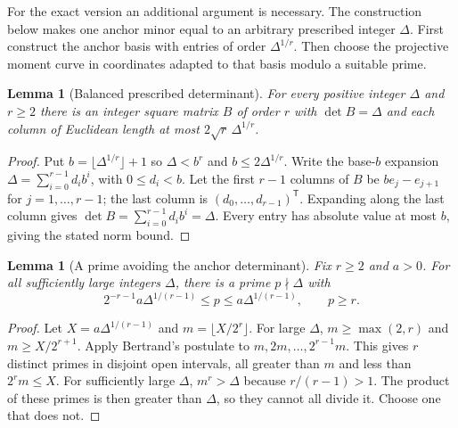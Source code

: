 \documentclass[11pt]{article}
\newtheorem{lemma}[theorem]{Lemma}
\theoremstyle{remark}\newtheorem{remark}[theorem]{Remark}
\begin{document}
For the exact version an additional argument is necessary. The construction below makes one anchor minor equal to an arbitrary prescribed integer $\Delta$. First construct the anchor basis with entries of order $\Delta^{1/r}$. Then choose the projective moment curve in coordinates adapted to that basis modulo a suitable prime.

\begin{lemma}[Balanced prescribed determinant]\label{lem:anchor}
For every positive integer $\Delta$ and $r\ge2$ there is an integer square matrix $B$ of order $r$ with $\det B=\Delta$ and each column of Euclidean length at most $2\sqrt r\,\Delta^{1/r}$.
\end{lemma}
\begin{proof}
Put $b=\lfloor\Delta^{1/r}\rfloor+1$ so $\Delta<b^r$ and $b\le 2\Delta^{1/r}$. Write the base-$b$ expansion $\Delta=\sum_{i=0}^{r-1}d_i b^i$, with $0\le d_i<b$. Let the first $r-1$ columns of $B$ be $b e_j-e_{j+1}$ for $j=1,\ldots,r-1$; the last column is $(d_0,\ldots,d_{r-1})^{\mathsf T}$. Expanding along the last column gives $\det B=\sum_{i=0}^{r-1}d_i b^i=\Delta$. Every entry has absolute value at most $b$, giving the stated norm bound.
\end{proof}

\begin{lemma}[A prime avoiding the anchor determinant]\label{lem:prime}
Fix $r\ge2$ and $a>0$. For all sufficiently large integers $\Delta$, there is a prime $p\nmid\Delta$ with
\begin{equation}\label{eq:prime}
 2^{-r-1}a\Delta^{1/(r-1)}\le p\le a\Delta^{1/(r-1)},\qquad p\ge r.
\end{equation}
\end{lemma}
\begin{proof}
Let $X=a\Delta^{1/(r-1)}$ and $m=\lfloor X/2^r\rfloor$. For large $\Delta$, $m\ge\max(2,r)$ and $m\ge X/2^{r+1}$. Apply Bertrand's postulate to $m,2m,\ldots,2^{r-1}m$. This gives $r$ distinct primes in disjoint open intervals, all greater than $m$ and less than $2^rm\le X$. For sufficiently large $\Delta$, $m^r>\Delta$ because $r/(r-1)>1$. The product of these primes is then greater than $\Delta$, so they cannot all divide it. Choose one that does not.
\end{proof}
\end{document}
